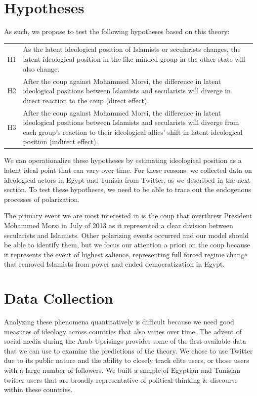 \documentclass[12pt]{article}
\begin{document}
\section*{Hypotheses}

As such, we propose to test the following hypotheses based on this theory:

\begin{tabular}{lp{15cm}}
	H1 & As the latent ideological position of Islamists or secularists changes, the latent ideological position in the like-minded group in the other state will also change.\\
	H2 & After the coup against Mohammed Morsi, the difference in latent ideological positions between Islamists and secularists will diverge in direct reaction to the coup (direct effect).\\
	H3 & After the coup against Mohammed Morsi, the difference in latent ideological positions between Islamists and secularists will diverge from each group's reaction to their ideological allies' shift in latent ideological position (indirect effect).
\end{tabular}

We can operationalize these hypotheses by estimating ideological position as a latent ideal point that can vary over time. For these reasons, we collected data on ideological actors in Egypt and Tunisia from Twitter, as we described in the next section. To test these hypotheses, we need to be able to trace out the endogenous processes of polarization.

The primary event we are most interested in is the coup that overthrew President Mohammed Morsi in July of 2013 as it represented a clear division between secularists and Islamists. Other polarizing events occurred and our model should be able to identify them, but we focus our attention a priori on the coup because it represents the event of highest salience, representing full forced regime change that removed Islamists from power and ended democratization in Egypt.
 
\section*{Data Collection}
Analyzing these phenomena quantitatively is difficult because we need good measures of ideology across countries that also varies over time. The advent of social media during the Arab Uprisings provides some of the first available data that we can use to examine the predictions of the theory. We chose to use Twitter due to its public nature and the ability to closely track elite users, or those users with a large number of followers. We built a sample of Egyptian and Tunisian twitter users that are broadly representative of political thinking \& discourse within these countries.
\end{document}
